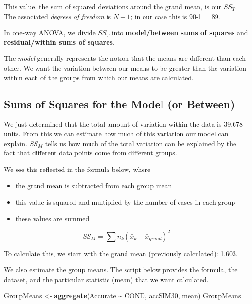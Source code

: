 \documentclass[
  11pt,
]{book}
\newenvironment{Shaded}{\begin{snugshade}}{\end{snugshade}}
\newcommand{\FunctionTok}[1]{\textcolor[rgb]{0.27,0.27,0.27}{\textbf{#1}}}
\newcommand{\NormalTok}[1]{#1}
\newcommand{\OtherTok}[1]{\textcolor[rgb]{0.37,0.37,0.37}{#1}}
\newcommand{\SpecialCharTok}[1]{\textcolor[rgb]{0.43,0.43,0.43}{\textbf{#1}}}
\providecommand{\tightlist}{%
  \setlength{\itemsep}{0pt}\setlength{\parskip}{0pt}}
\begin{document}
This value, the sum of squared deviations around the grand mean, is our \(SS_T\). The associated \emph{degrees of freedom} is \(N - 1\); in our case this is 90-1 = 89.

In one-way ANOVA, we divide \(SS_T\) into \textbf{model/between sums of squares} and \textbf{residual/within sums of squares}.

The \emph{model} generally represents the notion that the means are different than each other. We want the variation between our means to be greater than the variation within each of the groups from which our means are calculated.

\hypertarget{sums-of-squares-for-the-model-or-between}{%
\subsection{Sums of Squares for the Model (or Between)}\label{sums-of-squares-for-the-model-or-between}}

We just determined that the total amount of variation within the data is 39.678 units. From this we can estimate how much of this variation our model can explain. \(SS_M\) tells us how much of the total variation can be explained by the fact that different data points come from different groups.

We see this reflected in the formula below, where

\begin{itemize}
\tightlist
\item
  the grand mean is subtracted from each group mean
\item
  this value is squared and multiplied by the number of cases in each group
\item
  these values are summed
\end{itemize}

\[SS_{M}= \sum n_{k}(\bar{x}_{k}-\bar{x}_{grand})^{2}\]

To calculate this, we start with the grand mean (previously calculated): 1.603.

We also estimate the group means. The script below provides the formula, the dataset, and the particular statistic (mean) that we want calculated.

\begin{Shaded}
\begin{Highlighting}[]
\NormalTok{GroupMeans }\OtherTok{\textless{}{-}} \FunctionTok{aggregate}\NormalTok{(Accurate }\SpecialCharTok{\textasciitilde{}}\NormalTok{ COND, accSIM30, mean)}
\NormalTok{GroupMeans}
\end{Highlighting}
\end{Shaded}
\end{document}

